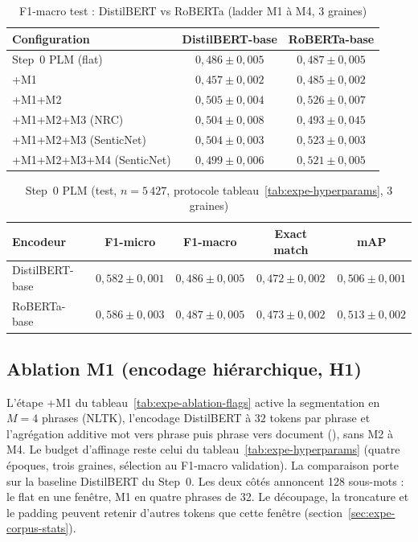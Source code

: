 \begin{table}[H]
\centering
\caption{F1-macro test : DistilBERT vs RoBERTa (ladder M1 à M4, 3 graines)}
\label{tab:expe-roberta-ablation}
\renewcommand{\arraystretch}{1.2}
\begin{tabular}{|l|c|c|}
\hline
\textbf{Configuration} & \textbf{DistilBERT-base} & \textbf{RoBERTa-base} \\
\hline
Step~0 PLM (flat) & $0{,}486 \pm 0{,}005$ & $0{,}487 \pm 0{,}005$ \\
\hline
+M1 & $0{,}457 \pm 0{,}002$ & $0{,}485 \pm 0{,}002$ \\
\hline
+M1+M2 & $0{,}505 \pm 0{,}004$ & $0{,}526 \pm 0{,}007$ \\
\hline
+M1+M2+M3 (NRC) & $0{,}504 \pm 0{,}008$ & $0{,}493 \pm 0{,}045$ \\
\hline
+M1+M2+M3 (SenticNet) & $0{,}504 \pm 0{,}003$ & $0{,}523 \pm 0{,}003$ \\
\hline
+M1+M2+M3+M4 (SenticNet) & $0{,}499 \pm 0{,}006$ & $0{,}521 \pm 0{,}005$ \\
\hline
\end{tabular}
\end{table}

\begin{table}[H]
\centering
\caption{Step~0 PLM (test, $n{=}5\,427$, protocole tableau~\ref{tab:expe-hyperparams}, 3 graines)}
\label{tab:expe-baseline-step0}
\renewcommand{\arraystretch}{1.2}
\begin{tabular}{|l|c|c|c|c|}
\hline
\textbf{Encodeur} & \textbf{F1-micro} & \textbf{F1-macro} & \textbf{Exact match} & \textbf{mAP} \\
\hline
DistilBERT-base & $0{,}582 \pm 0{,}001$ & $0{,}486 \pm 0{,}005$ & $0{,}472 \pm 0{,}002$ & $0{,}506 \pm 0{,}001$ \\
\hline
RoBERTa-base & $0{,}586 \pm 0{,}003$ & $0{,}487 \pm 0{,}005$ & $0{,}473 \pm 0{,}002$ & $0{,}513 \pm 0{,}002$ \\
\hline
\end{tabular}
\end{table}

\subsection{Ablation M1 (encodage hiérarchique, H1)}
\label{sec:expe-m1-h1}

L'étape +M1 du tableau~\ref{tab:expe-ablation-flags} active la
segmentation en $M{=}4$ phrases (NLTK), l'encodage DistilBERT à
$32$ tokens par phrase et l'agrégation additive mot vers phrase puis
phrase vers document (), sans M2 à M4.
Le budget d'affinage reste celui du tableau~\ref{tab:expe-hyperparams}
(quatre époques, trois graines, sélection au F1-macro validation).
La comparaison porte sur la baseline DistilBERT du Step~0. Les deux
côtés annoncent 128 sous-mots : le flat en une fenêtre, M1 en quatre
phrases de 32. Le découpage, la troncature et le padding peuvent retenir
d'autres tokens que cette fenêtre
(section~\ref{sec:expe-corpus-stats}).

